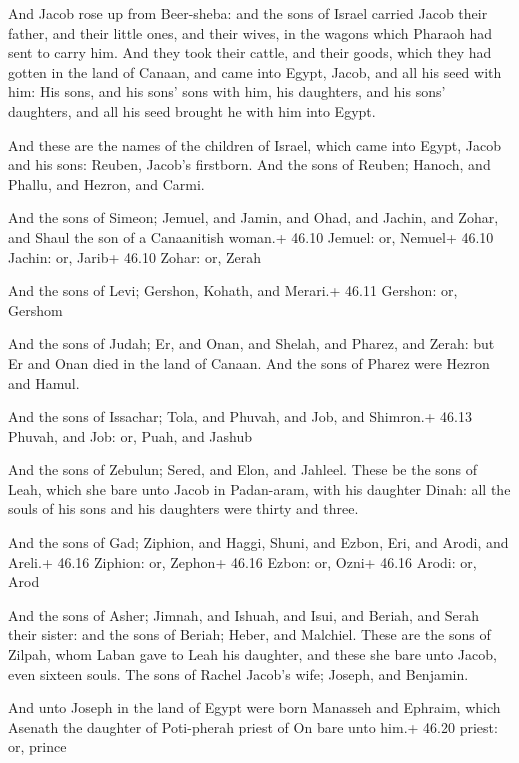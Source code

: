  And Jacob rose up from Beer-sheba: and the sons of Israel
carried Jacob their father, and their little ones, and their wives, in
the wagons which Pharaoh had sent to carry him.  And they
took their cattle, and their goods, which they had gotten in the land of
Canaan, and came into Egypt, Jacob, and all his seed with him:
 His sons, and his sons' sons with him, his daughters, and
his sons' daughters, and all his seed brought he with him into Egypt.

 And these are the names of the children of Israel, which
came into Egypt, Jacob and his sons: Reuben, Jacob's firstborn.
 And the sons of Reuben; Hanoch, and Phallu, and Hezron, and
Carmi.

 And the sons of Simeon; Jemuel, and Jamin, and Ohad, and
Jachin, and Zohar, and Shaul the son of a Canaanitish woman.+ 46.10
Jemuel: or, Nemuel+ 46.10 Jachin: or, Jarib+ 46.10 Zohar: or, Zerah

 And the sons of Levi; Gershon, Kohath, and Merari.+
46.11 Gershon: or, Gershom

 And the sons of Judah; Er, and Onan, and Shelah, and
Pharez, and Zerah: but Er and Onan died in the land of Canaan. And the
sons of Pharez were Hezron and Hamul.

 And the sons of Issachar; Tola, and Phuvah, and Job, and
Shimron.+ 46.13 Phuvah, and Job: or, Puah, and Jashub

 And the sons of Zebulun; Sered, and Elon, and Jahleel.
 These be the sons of Leah, which she bare unto Jacob in
Padan-aram, with his daughter Dinah: all the souls of his sons and his
daughters were thirty and three.

 And the sons of Gad; Ziphion, and Haggi, Shuni, and
Ezbon, Eri, and Arodi, and Areli.+ 46.16 Ziphion: or, Zephon+ 46.16
Ezbon: or, Ozni+ 46.16 Arodi: or, Arod

 And the sons of Asher; Jimnah, and Ishuah, and Isui, and
Beriah, and Serah their sister: and the sons of Beriah; Heber, and
Malchiel.  These are the sons of Zilpah, whom Laban gave to
Leah his daughter, and these she bare unto Jacob, even sixteen souls.
 The sons of Rachel Jacob's wife; Joseph, and Benjamin.

 And unto Joseph in the land of Egypt were born Manasseh
and Ephraim, which Asenath the daughter of Poti-pherah priest of On bare
unto him.+ 46.20 priest: or, prince

